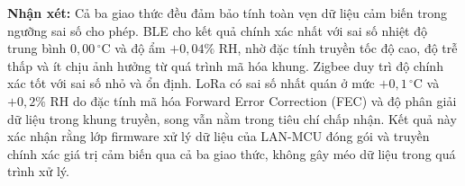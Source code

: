         \textbf{Nhận xét:} Cả ba giao thức đều đảm bảo tính toàn vẹn dữ liệu cảm biến trong ngưỡng sai số cho phép. BLE cho kết quả chính xác nhất với sai số nhiệt độ trung bình $0{,}00\,{^\circ}\text{C}$ và độ ẩm $+0{,}04\%$ RH, nhờ đặc tính truyền tốc độ cao, độ trễ thấp và ít chịu ảnh hưởng từ quá trình mã hóa khung. Zigbee duy trì độ chính xác tốt với sai số nhỏ và ổn định. LoRa có sai số nhất quán ở mức $+0{,}1\,{^\circ}\text{C}$ và $+0{,}2\%$ RH do đặc tính mã hóa Forward Error Correction (FEC) và độ phân giải dữ liệu trong khung truyền, song vẫn nằm trong tiêu chí chấp nhận. Kết quả này xác nhận rằng lớp firmware xử lý dữ liệu của LAN-MCU đóng gói và truyền chính xác giá trị cảm biến qua cả ba giao thức, không gây méo dữ liệu trong quá trình xử lý.

